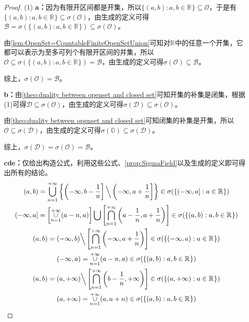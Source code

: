 \begin{proof}
	(1) \textbf{a：}因为有限开区间都是开集，所以$\{(a,b):a,b\in\mathbb{R}^{}\}\subseteq\mathcal{O}$，于是有$\{(a,b):a,b\in\mathbb{R}^{}\}\subseteq\sigma(\mathcal{O})$，由生成的定义可得$\mathcal{B}=\sigma(\{(a,b):a,b\in\mathbb{R}^{}\})\subseteq\sigma(\mathcal{O})$。\par
	由\cref{lem:OpenSet=CountableFiniteOpenSetUnion}可知对$\mathbb{R}^{}$中的任意一个开集，它都可以表示为至多可列个有限开区间的并集，所以$\mathcal{O}\subseteq\sigma(\{(a,b):a,b\in\mathbb{R}^{}\})=\mathcal{B}$，由生成的定义可得$\sigma(\mathcal{O})\subseteq\mathcal{B}$。\par
	综上，$\sigma(\mathcal{O})=\mathcal{B}$。\par
	\textbf{b：}由\cref{theo:duality between openset and closed set}可知开集的补集是闭集，根据(1)可得$\mathcal{D}\subseteq\sigma(\mathcal{O})$，由生成的定义可得$\sigma(\mathcal{D})\subseteq\sigma(\mathcal{O})$。\par
	由\cref{theo:duality between openset and closed set}可知闭集的补集是开集，所以$\mathcal{O}\subseteq\sigma(\mathcal{D})$，由生成的定义可得$\sigma(\mathbb{O})\subseteq\sigma(\mathcal{D})$。\par
	综上，$\sigma(\mathcal{D})=\sigma(\mathcal{O})=\mathcal{B}$。\par
	\textbf{cde：}仅给出构造公式，利用这些公式、\cref{prop:SigmaField}以及生成的定义即可得出所有的结论。
	\begin{gather*}
		(a,b)=\underset{n=1}{\overset{+\infty}{\bigcup}}\left\{\left(-\infty,b-\frac{1}{n}\right]\Big\backslash\left(-\infty,a+\frac{1}{n}\right]\right\}\in\sigma(\{(-\infty,a]:a\in\mathbb{R}^{}\}) \\
		(-\infty,a]=\left[\underset{n=1}{\overset{+\infty}{\cup}}(a-n,a)\right]\bigcup\left[\underset{n=1}{\overset{+\infty}{\bigcap}}\left(a-\frac{1}{n},a+\frac{1}{n}\right)\right]\in\sigma(\{(a,b):a,b\in\mathbb{R}^{}\}) \\
		(a,b)=(-\infty,b)\Big\backslash\left[\underset{n=1}{\overset{+\infty}{\bigcap}}\left(-\infty,a+\frac{1}{n}\right)\right]\in\sigma(\{(-\infty,a):a\in\mathbb{R}^{}\}) \\
		(-\infty,a)=\underset{n=1}{\overset{+\infty}{\cup}}(a-n,a)\in\sigma(\{(a,b):a,b\in\mathbb{R}^{}\}) \\
		(a,b)=(a,+\infty)\Big\backslash\left[\underset{n=1}{\overset{+\infty}{\bigcap}}\left(b-\frac{1}{n},+\infty\right)\right]\in\sigma(\{(a,+\infty):a\in\mathbb{R}^{}\}) \\
		(a,+\infty)=\underset{n=1}{\overset{+\infty}{\cup}}(a,a+n)\in\sigma(\{(a,b):a,b\in\mathbb{R}^{}\}) \\

\end{gather*}
\end{proof}
